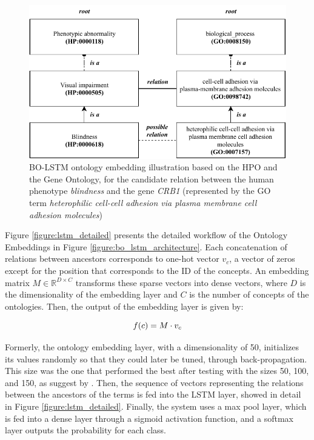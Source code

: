 \begin{figure}[ht]
\captionsetup{font=small}
\centering
\includegraphics[width=13cm]{images/model_ds.pdf}
\fontsize{9}{10.8}\caption[BO-LSTM Ontology Embedding Illustration]{BO-LSTM ontology embedding illustration based on the HPO and the Gene Ontology, for the candidate relation between the human phenotype \textit{blindness} and the gene \textit{CRB1} (represented by the GO term \textit{heterophilic cell-cell adhesion via plasma membrane cell adhesion molecules})}
\label{figure:model_ds}
\end{figure}

Figure \ref{figure:lstm_detailed} presents the detailed workflow of the Ontology Embeddings in Figure \ref{figure:bo_lstm_architecture}. Each concatenation of relations between ancestors corresponds to one-hot vector $v_c$, a vector of zeros except for the position that corresponds to the ID of the concepts. An embedding matrix $M \in \mathbb{R}^{D \times C}$ transforms these sparse vectors into dense vectors, where $D$ is the dimensionality of the embedding layer and $C$ is the number of concepts of the ontologies. Then, the output of the embedding layer is given by:

\begin{equation}
\small
f(c) = M \cdot v_c
\label{equation:ontologyembedding}
\end{equation}

Formerly, the ontology embedding layer, with a dimensionality of 50, initializes its values randomly so that they could later be tuned, through back-propagation. This size was the one that performed the best after testing with the sizes 50, 100, and 150, as suggest by \cite{xu-etal-2015-classifying}. Then, the sequence of vectors representing the relations between the ancestors of the terms is fed into the LSTM layer, showed in detail in Figure \ref{figure:lstm_detailed}. Finally, the system uses a max pool layer, which is fed into a dense layer through a sigmoid activation function, and a softmax layer outputs the probability for each class.

